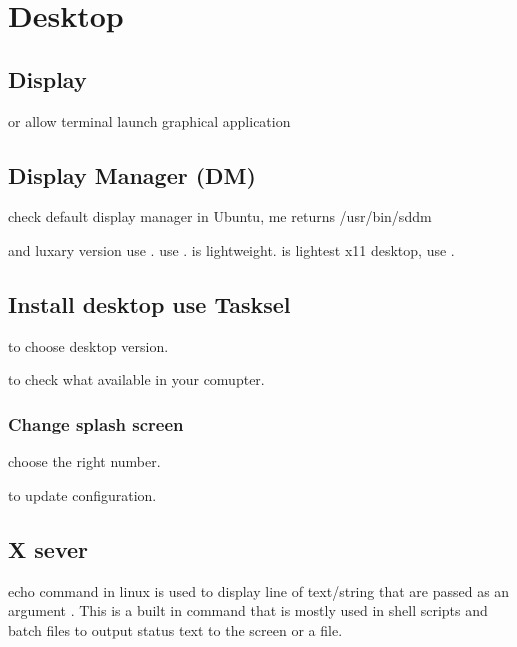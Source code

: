 \chapter{Desktop}

\section{Display}

 or  allow terminal launch graphical application


\section{Display Manager (DM)}

 check default display manager in Ubuntu, me returns /usr/bin/sddm

 and luxary version  use .  use .  is lightweight.  is lightest x11 desktop, use .


\section{Install desktop use Tasksel}

 to choose desktop version.

 to check what available in your comupter.



\subsection{Change splash screen}

 choose the right number.

 to update configuration.



\section{X sever}

echo command in linux is used to display line of text/string that are passed as an argument . This is a built in command that is mostly used in shell scripts and batch files to output status text to the screen or a file.

